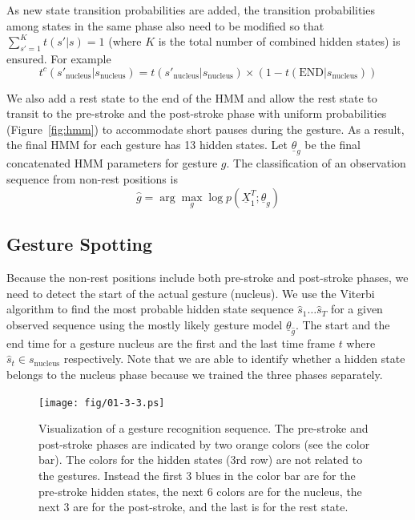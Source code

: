 \documentclass{sig-alternate-2013}
\begin{document}
As new state transition probabilities are added, the transition probabilities among
states in the same phase also need to be modified so that $\sum_{s' = 1}^K t(s'|s) = 1$ (where
$K$ is the total number of combined hidden states) is ensured. For example
\begin{displaymath}
t^c(s'_{\text{nucleus}} | s_{\text{nucleus}}) = t(s'_{\text{nucleus}} | s_{\text{nucleus}})
  \times (1 - t(\text{END} | s_{\text{nucleus}}))
\end{displaymath}

We also add a rest state to the end of the HMM and allow the rest state to transit to the pre-stroke
and the post-stroke phase with uniform probabilities (Figure~\ref{fig:hmm}) to accommodate short pauses during the gesture.
As a result, the final HMM for each gesture has 13 hidden states.
Let $\underline{\theta}_g$ be the final concatenated HMM parameters for gesture $g$. The classification
of an observation sequence from non-rest positions is 
\begin{displaymath}
\hat{g} = \arg\max_g\log p(\underline{X}_1^T; \underline{\theta}_g)
\end{displaymath}

\subsection{Gesture Spotting}
Because the non-rest positions include both pre-stroke and post-stroke phases, we need
to detect the start of the actual gesture (nucleus). We use the Viterbi algorithm
to find the most probable hidden state sequence $\hat{s}_1\ldots\hat{s}_T$ for a given observed sequence using 
the mostly likely gesture model $\underline{\theta}_{\hat{g}}$. The start and the end time for a gesture nucleus are
the first and the last time frame $t$ where $\hat{s}_t\in s_{\text{nucleus}}$ respectively. Note that
we are able to identify whether a hidden state belongs to the nucleus phase because we trained the three phases
separately.

\begin{figure}[tb]
\centering
\texttt{[image: fig/01-3-3.ps]}
\caption{Visualization of a gesture recognition sequence. 
The pre-stroke and post-stroke phases are indicated by two orange colors (see the color bar). 
The colors for the hidden states (3rd row) are not related 
to the gestures. Instead the first 3 blues in the color bar are for the pre-stroke hidden states, the next 6 colors are for the nucleus, 
the next 3 are for the post-stroke, and the last is for the rest state.}
\label{fig:decoding}
\end{figure}
\end{document}
